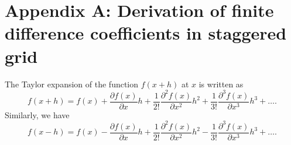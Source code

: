 \appendix
\section{Appendix A: Derivation of finite difference coefficients in staggered grid}\label{appendix:1}

The Taylor expansion of the function $f(x+h)$ at $x$ is written as
\begin{equation}\label{eq:Taylor}
f(x+h)=f(x)+\frac{\partial f(x)}{\partial x}h+\frac{1}{2!}\frac{\partial^2 f(x)}{\partial x^2}h^2+\frac{1}{3!}\frac{\partial^3 f(x)}{\partial x^3}h^3+\ldots.
\end{equation}
Similarly, we have
\begin{equation}
f(x-h)=f(x)-\frac{\partial f(x)}{\partial x}h+\frac{1}{2!}\frac{\partial^2 f(x)}{\partial x^2}h^2-\frac{1}{3!}\frac{\partial^3 f(x)}{\partial x^3}h^3+\ldots.
\end{equation}


